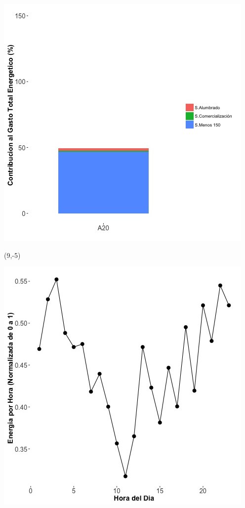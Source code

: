 \documentclass{article}\usepackage[]{graphicx}\usepackage[]{color}
\newenvironment{knitrout}{}{} %
\begin{document}
\begin{knitrout}
\color{fgcolor}
\includegraphics[scale=0.65]{figure/A20_subvars_plot.jpg} 
\end{knitrout}

 \begin{textblock}{1}(9,-5)
\begin{minipage}{20em}
\begingroup

\endgroup
\end{minipage}
\end{textblock}

\begin{knitrout}
\color{fgcolor}
\includegraphics[scale=0.65]{figure/A20_plot_norm_median} 
\end{knitrout}
\end{document}
